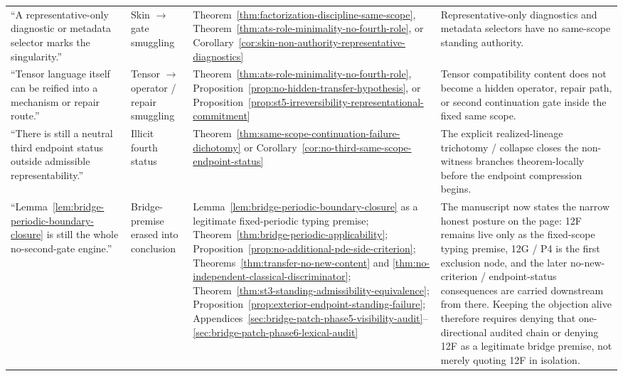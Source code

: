 \begin{center}
\begin{tabularx}{0.98\textwidth}{@{}L{0.24\textwidth}L{0.17\textwidth}L{0.20\textwidth}Y@{}}
``A representative-only diagnostic or metadata selector marks the singularity.'' & Skin $\rightarrow$ gate smuggling & Theorem~\ref{thm:factorization-discipline-same-scope}, Theorem~\ref{thm:ats-role-minimality-no-fourth-role}, or Corollary~\ref{cor:skin-non-authority-representative-diagnostics} & Representative-only diagnostics and metadata selectors have no same-scope standing authority.\\
``Tensor language itself can be reified into a mechanism or repair route.'' & Tensor $\rightarrow$ operator / repair smuggling & Theorem~\ref{thm:ats-role-minimality-no-fourth-role}, Proposition~\ref{prop:no-hidden-transfer-hypothesis}, or Proposition~\ref{prop:st5-irreversibility-representational-commitment} & Tensor compatibility content does not become a hidden operator, repair path, or second continuation gate inside the fixed same scope.\\
``There is still a neutral third endpoint status outside admissible representability.'' & Illicit fourth status & Theorem~\ref{thm:same-scope-continuation-failure-dichotomy} or Corollary~\ref{cor:no-third-same-scope-endpoint-status} & The explicit realized-lineage trichotomy / collapse closes the non-witness branches theorem-locally before the endpoint compression begins.\\
``Lemma~\ref{lem:bridge-periodic-boundary-closure} is still the whole no-second-gate engine.'' & Bridge-premise erased into conclusion & Lemma~\ref{lem:bridge-periodic-boundary-closure} as a legitimate fixed-periodic typing premise; Theorem~\ref{thm:bridge-periodic-applicability}; Proposition~\ref{prop:no-additional-pde-side-criterion}; Theorems~\ref{thm:transfer-no-new-content} and \ref{thm:no-independent-classical-discriminator}; Theorem~\ref{thm:st3-standing-admissibility-equivalence}; Proposition~\ref{prop:exterior-endpoint-standing-failure}; Appendices~\ref{sec:bridge-patch-phase5-visibility-audit}--\ref{sec:bridge-patch-phase6-lexical-audit} & The manuscript now states the narrow honest posture on the page: 12F remains live only as the fixed-scope typing premise, 12G / P4 is the first exclusion node, and the later no-new-criterion / endpoint-status consequences are carried downstream from there. Keeping the objection alive therefore requires denying that one-directional audited chain or denying 12F as a legitimate bridge premise, not merely quoting 12F in isolation.\\
\bottomrule
\end{tabularx}
\end{center}

